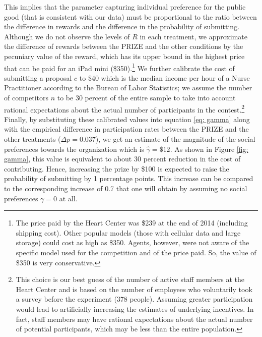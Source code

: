 \documentclass[11pt, titlepage]{article}
\begin{document}
This implies that the parameter capturing individual preference for the
public good (that is consistent with our data) must be proportional to
the ratio between the difference in rewards and the difference in the
probability of submitting. Although we do not observe the levels of
\(R\) in each treatment, we approximate the difference of rewards
between the PRIZE and the other conditions by the pecuniary value of the
reward, which has its upper bound in the highest price that can be paid
for an iPad mini (\$350).\footnote{The price paid by the Heart Center
  was \$239 at the end of 2014 (including shipping cost). Other popular
  models (those with cellular data and large storage) could cost as high
  as \$350. Agents, however, were not aware of the specific model used
  for the competition and of the price paid. So, the value of \$350 is
  very conservative.} We further calibrate the cost of submitting a
proposal \(c\) to \$40 which is the median income per hour of a Nurse
Practitioner according to the Bureau of Labor Statistics; we assume the
number of competitors \(n\) to be 30 percent of the entire sample to
take into account rational expectations about the actual number of
participants in the contest.\footnote{This choice is our best guess of
  the number of active staff members at the Heart Center and is based on
  the number of employees who voluntarily took a survey before the
  experiment (378 people). Assuming greater participation would lead to
  artificially increasing the estimates of underlying incentives. In
  fact, staff members may have rational expectations about the actual
  number of potential participants, which may be less than the entire
  population.} Finally, by substituting these calibrated values into
equation \eqref{eq: gamma} along with the empirical difference in
participation rates between the PRIZE and the other treatments
(\(\Delta p=0.037\)), we get an estimate of the magnitude of the social
preferences towards the organization which is \(\hat\gamma=\$12\). As
shown in Figure \ref{fig: gamma}, this value is equivalent to about 30
percent reduction in the cost of contributing. Hence, increasing the
prize by \$100 is expected to raise the probability of submitting by 1
percentage points. This increase can be compared to the corresponding
increase of 0.7 that one will obtain by assuming no social preferences
\(\gamma=0\) at all.
\end{document}
